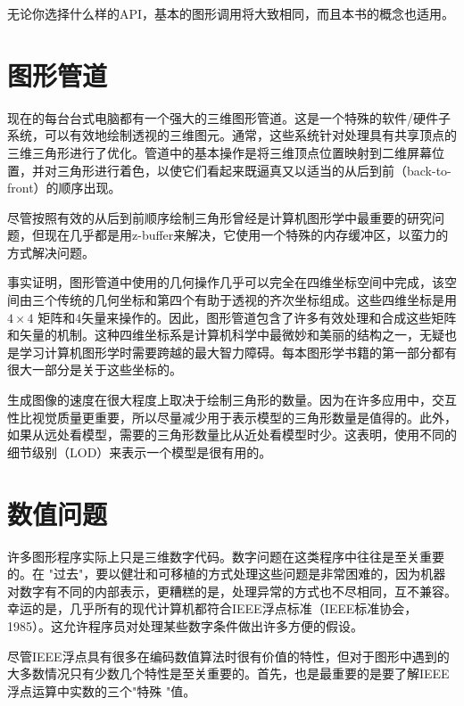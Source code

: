 \documentclass[lang=cn,12pt]{elegantbook}
\begin{document}
无论你选择什么样的API，基本的图形调用将大致相同，而且本书的概念也适用。

\section{图形管道}

现在的每台台式电脑都有一个强大的三维图形管道。这是一个特殊的软件/硬件子系统，可以有效地绘制透视的三维图元。通常，这些系统针对处理具有共享顶点的三维三角形进行了优化。管道中的基本操作是将三维顶点位置映射到二维屏幕位置，并对三角形进行着色，以使它们看起来既逼真又以适当的从后到前（back-to-front）的顺序出现。

尽管按照有效的从后到前顺序绘制三角形曾经是计算机图形学中最重要的研究问题，但现在几乎都是用z-buffer来解决，它使用一个特殊的内存缓冲区，以蛮力的方式解决问题。

事实证明，图形管道中使用的几何操作几乎可以完全在四维坐标空间中完成，该空间由三个传统的几何坐标和第四个有助于透视的齐次坐标组成。这些四维坐标是用 $4 \times 4$ 矩阵和4矢量来操作的。因此，图形管道包含了许多有效处理和合成这些矩阵和矢量的机制。这种四维坐标系是计算机科学中最微妙和美丽的结构之一，无疑也是学习计算机图形学时需要跨越的最大智力障碍。每本图形学书籍的第一部分都有很大一部分是关于这些坐标的。

生成图像的速度在很大程度上取决于绘制三角形的数量。因为在许多应用中，交互性比视觉质量更重要，所以尽量减少用于表示模型的三角形数量是值得的。此外，如果从远处看模型，需要的三角形数量比从近处看模型时少。这表明，使用不同的细节级别（LOD）来表示一个模型是很有用的。

\section{数值问题}

许多图形程序实际上只是三维数字代码。数字问题在这类程序中往往是至关重要的。在 "过去"，要以健壮和可移植的方式处理这些问题是非常困难的，因为机器对数字有不同的内部表示，更糟糕的是，处理异常的方式也不尽相同，互不兼容。幸运的是，几乎所有的现代计算机都符合IEEE浮点标准（IEEE标准协会，1985）。这允许程序员对处理某些数字条件做出许多方便的假设。


尽管IEEE浮点具有很多在编码数值算法时很有价值的特性，但对于图形中遇到的大多数情况只有少数几个特性是至关重要的。首先，也是最重要的是要了解IEEE浮点运算中实数的三个"特殊 "值。
\end{document}
